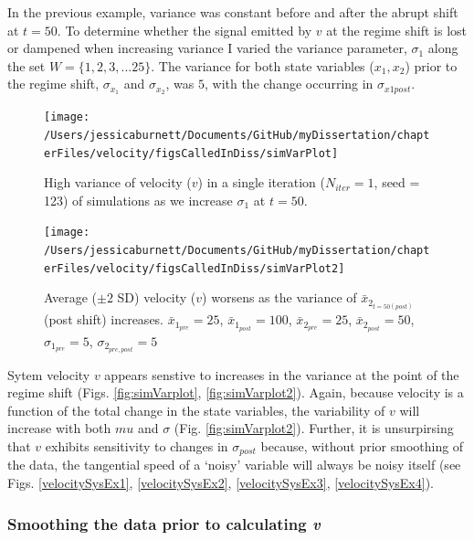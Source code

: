 \documentclass[12pt,twoside,openany]{reedthesis}
\begin{document}
In the previous example, variance was constant before and after the abrupt shift at \(t=50\). To determine whether the signal emitted by \(v\) at the regime shift is lost or dampened when increasing variance I varied the variance parameter, \(\sigma_1\) along the set \(W = \{1,2,3,...25 \}\). The variance for both state variables (\(x_1, x_2\)) prior to the regime shift, \(\sigma_{x_1}\) and \(\sigma_{x_2}\), was \(5\), with the change occurring in \(\sigma_{x1post}\).
\begin{figure}
\texttt{[image: /Users/jessicaburnett/Documents/GitHub/myDissertation/chapterFiles/velocity/figsCalledInDiss/simVarPlot]} \caption{High variance of velocity ($v$) in a single iteration ($N_{iter}=1$, seed = 123) of simulations as we increase $\sigma_1$ at $t=50$.}\label{fig:simVarPlot}
\end{figure}
\begin{figure}
\texttt{[image: /Users/jessicaburnett/Documents/GitHub/myDissertation/chapterFiles/velocity/figsCalledInDiss/simVarPlot2]} \caption{Average ($\pm 2$ SD) velocity ($v$) worsens as the variance of $\bar{x}_{2_{t=50 (post)}}$ (post shift) increases. $\bar{x}_{1_{pre}} = 25$, $\bar{x}_{1_{post}} = 100$, $\bar{x}_{2_{pre}} = 25$, $\bar{x}_{2_{post}} = 50$, $\sigma_{1_{pre}} = 5$, $\sigma_{2_{pre,post}} = 5$}\label{fig:simVarPlot2}
\end{figure}
Sytem velocity \(v\) appears senstive to increases in the variance at the point of the regime shift (Figs. \ref{fig:simVarplot}, \ref{fig:simVarplot2}). Again, because velocity is a function of the total change in the state variables, the variability of \(v\) will increase with both \(mu\) and \(\sigma\) (Fig. \ref{fig:simVarplot2}). Further, it is unsurpirsing that \(v\) exhibits sensitivity to changes in \(\sigma_{post}\) because, without prior smoothing of the data, the tangential speed of a `noisy' variable will always be noisy itself (see Figs. \ref{velocitySysEx1}, \ref{velocitySysEx2}, \ref{velocitySysEx3}, \ref{velocitySysEx4}).

\hypertarget{smoothing-the-data-prior-to-calculating-v}{%
\subsubsection{\texorpdfstring{Smoothing the data prior to calculating \emph{v}}{Smoothing the data prior to calculating v}}\label{smoothing-the-data-prior-to-calculating-v}}
\end{document}
